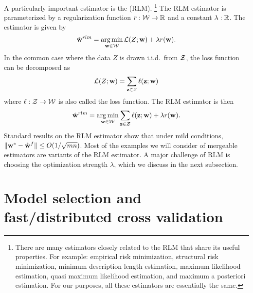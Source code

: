 \documentclass[thesis.tex]{subfiles}
\begin{document}
A particularly important estimator is the  (RLM).%
\footnote{
    There are many estimators closely related to the RLM that share its useful properties.
    For example: 
    empirical risk minimization,
    structural risk minimization,
    minimum description length estimation,
    maximum likelihood estimation, 
    quasi maximum likelihood estimation,
    and maximum a posteriori estimation.
    For our purposes, all these estimators are essentially the same.
}
The RLM estimator is parameterized by a regularization function $r : {\mathcal W} \to \mathbb R$ 
and a constant $\lambda : \mathbb R$.
The estimator is given by
\begin{equation}
    \label{eq:notation:rlm}
    \hat{\mathbf w}^{rlm} = \operatorname*{arg\,min}_{\mathbf w\in{\mathcal W}} \mathcal{L}(Z;\mathbf w) + \lambda r(\mathbf w)
    .
\end{equation}
In the common case where the data $Z$ is drawn i.i.d.\ from ${\mathcal Z}$, the loss function can be decomposed as 
\begin{equation}
    \mathcal{L}(Z;\mathbf w) = \sum_{\mathbf z\in Z} \ell(\mathbf z;\mathbf w)
\end{equation}
where $\ell : {\mathcal Z} \to {\mathcal W}$ is also called the loss function.
The RLM estimator is then
\begin{equation}
    \label{eq:notation:rlm:independent}
    \hat{\mathbf w}^{rlm} = \operatorname*{arg\,min}_{\mathbf w\in{\mathcal W}} \sum_{\mathbf z\in{\mathcal Z}}\ell(\mathbf z;\mathbf w) + \lambda r(\mathbf w)
    .
\end{equation}
Standard results on the RLM estimator show that under mild conditions,
${\lVert {{\mathbf w^{*}}-{\hat{\mathbf w}}^f} \rVert}\le O(1/\sqrt{mn})$.
Most of the examples we will consider of mergeable estimators are variants of the RLM estimator.
A major challenge of RLM is choosing the optimization strength $\lambda$,
which we discuss in the next subsection.


\section{Model selection and fast/distributed cross validation}
\end{document}
